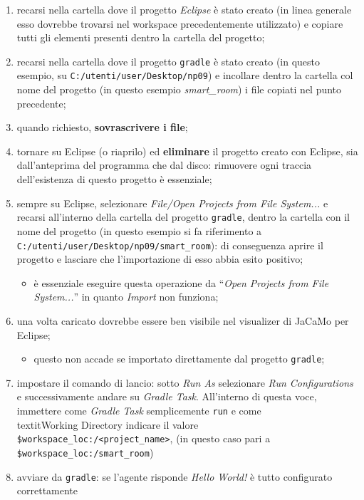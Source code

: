 \documentclass[12pt,a4paper,openright,oneside]{report}
\newcommand{\quotes}[1]{``#1''}
\begin{document}
\begin{enumerate}
	\item recarsi nella cartella dove il progetto \textit{Eclipse} è stato creato (in linea generale esso dovrebbe trovarsi nel workspace precedentemente utilizzato) e copiare tutti gli elementi presenti dentro la cartella del progetto;
	
	\item recarsi nella cartella dove il progetto \texttt{gradle} è stato creato (in questo esempio, su \texttt{C:/utenti/user/Desktop/np09}) e incollare dentro la cartella col nome del progetto (in questo esempio \textit{smart\_room}) i file copiati nel punto precedente;
	
	\item quando richiesto, \textbf{sovrascrivere i file};
	
	\item tornare su Eclipse (o riaprilo) ed \textbf{eliminare} il progetto creato con Eclipse, sia dall'anteprima del programma che dal disco: rimuovere ogni traccia dell'esistenza di questo progetto è essenziale;
	
	\item sempre su Eclipse, selezionare \textit{File/Open Projects from File System...} e recarsi all'interno della cartella del progetto \texttt{gradle}, dentro la cartella con il nome del progetto (in questo esempio si fa riferimento a \texttt{C:/utenti/user/Desktop/np09/smart\_room}): di conseguenza aprire il progetto e lasciare che l'importazione di esso abbia esito positivo;
	\begin{itemize}
		\item è essenziale eseguire questa operazione da \quotes{\textit{Open Projects from File System...}} in quanto \textit{Import} non funziona;
	\end{itemize}
	
	\item una volta caricato dovrebbe essere ben visibile nel visualizer di JaCaMo per Eclipse;
	\begin{itemize}
		\item questo non accade se importato direttamente dal progetto \texttt{gradle};
	\end{itemize}
	
	\item impostare il comando di lancio: sotto \textit{Run As} selezionare \textit{Run Configurations} e successivamente andare su \textit{Gradle Task}. All'interno di questa voce, immettere come \textit{Gradle Task} semplicemente \texttt{run} e come \\textit{Working Directory} indicare il valore\\
		\texttt{\${workspace\_loc:/<project\_name>}}, (in questo caso pari a \\
		\texttt{\$workspace\_loc:/smart\_room})
		
	\item avviare da \texttt{gradle}: se l'agente risponde \textit{Hello World!} è tutto configurato correttamente
\end{enumerate}
\end{document}
